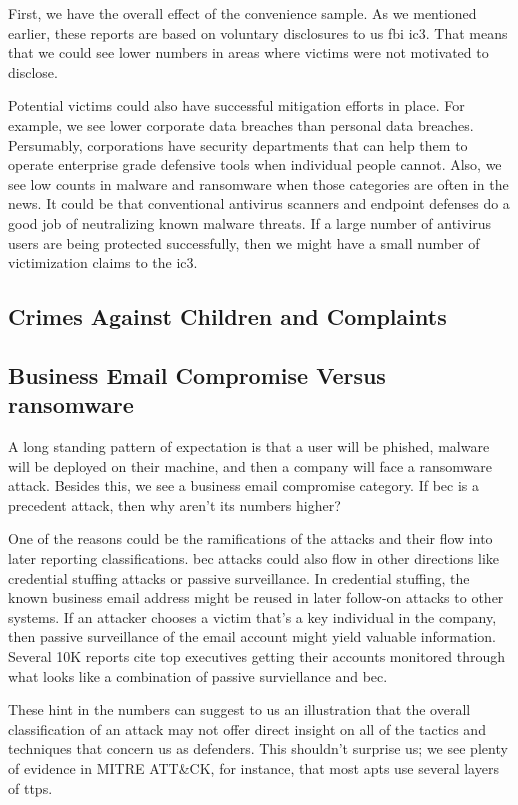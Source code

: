 First, we have the overall effect of the convenience sample.  As we mentioned earlier, these reports are based on voluntary disclosures to \gls{us} \gls{fbi} \gls{ic3}.  That means that we could see lower numbers in areas where victims were not motivated to disclose.

Potential victims could also have successful mitigation efforts in place.  For example, we see lower corporate data breaches than personal data breaches.  Persumably, corporations have security departments that can help them to operate enterprise grade defensive tools when individual people cannot.  Also, we see low counts in \gls{malware} and \gls{ransomware} when those categories are often in the news.  It could be that conventional antivirus scanners and endpoint defenses do a good job of neutralizing known \gls{malware} threats.  If a large number of antivirus users are being protected successfully, then we might have a small number of victimization claims to the \gls{ic3}.


\subsection{Crimes Against Children and Complaints}

\subsection{Business Email Compromise Versus \gls{ransomware}}
A long standing pattern of expectation is that a user will be phished, \gls{malware} will be deployed on their machine, and then a company will face a \gls{ransomware} \gls{attack}.  Besides this, we see a business email compromise category.  If \gls{bec} is a precedent \gls{attack}, then why aren't its numbers higher?

One of the reasons could be the ramifications of the attacks and their flow into later reporting classifications.  \gls{bec}
attacks could also flow in other directions like credential stuffing attacks or passive surveillance. In credential stuffing, the known business email address might be reused in later follow-on attacks to other systems.  If an attacker chooses a victim that's a key individual in the company, then passive surveillance of the email account might yield valuable information.  Several 10K reports cite top executives getting their accounts monitored through what looks like a combination of passive surviellance and \gls{bec}.

These hint in the numbers can suggest to us an illustration that the overall classification of an \gls{attack} may not offer direct insight on all of the tactics and techniques that concern us as defenders.  This shouldn't surprise us; we see plenty of evidence in MITRE ATT\&CK, for instance, that most \gls{apt}s use several layers of \gls{ttps}.

